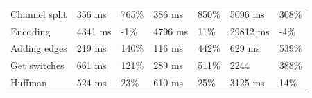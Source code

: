 \begin{table}[H]
\begin{tabular}{@{}lllllll@{}}
		Channel split           & 356 ms                                                                                    & 765\%                                                                          & 386 ms                                                                                     & 850\%                                                                         & 5096 ms                                                                                 & 308\%                                                                         \\
		Encoding                & 4341 ms                                                                                   & -1\%                                                                           & 4796 ms                                                                                    & 11\%                                                                          & 29812 ms                                                                                & -4\%                                                                          \\
		Adding edges            & 219 ms                                                                                    & 140\%                                                                          & 116 ms                                                                                     & 442\%                                                                         & 629 ms                                                                                  & 539\%                                                                         \\
		Get switches            & 661 ms                                                                                    & 121\%                                                                          & 289 ms                                                                                     & 511\%                                                                         & 2244                                                                                    & 388\%                                                                         \\
		Huffman                 & 524 ms                                                                                    & 23\%                                                                           & 610 ms                                                                                     & 25\%                                                                          & 3125 ms                                                                                 & 14\%                                                                          \\ \midrule

\end{tabular}
\end{table}

